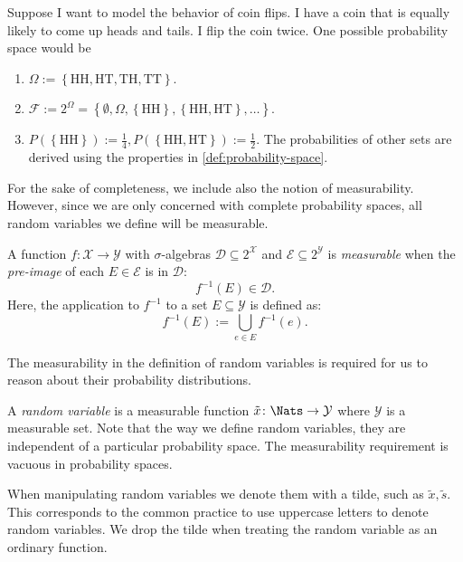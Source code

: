 \begin{example} \label{exm:probability-space}
 Suppose I want to model the behavior of coin flips. I have a coin that is equally likely to come up heads and tails. I flip the coin twice. One possible probability space would be
  \begin{enumerate}
  \item $\Omega := \left\{ \mathrm{HH}, \mathrm{HT}, \mathrm{TH}, \mathrm{TT} \right\}$.
  \item $\mathcal{F} := 2^{\Omega } = \left\{ \emptyset, \Omega, \left\{ \mathrm{HH} \right\}, \left\{ \mathrm{HH}, \mathrm{HT} \right\}, \dots  \right\}$.
  \item $P(\left\{ \mathrm{HH} \right\}) := \frac{1}{4},  P(\left\{ \mathrm{HH}, \mathrm{HT} \right\}) := \frac{1}{2}$. The probabilities of other sets are derived using the properties in \cref{def:probability-space}.
  \end{enumerate}
\end{example}


For the sake of completeness, we include also the notion of measurability. However, since we are only concerned with complete probability spaces, all random variables we define will be measurable. 
\begin{definition} \label{def:preimage-measurable}
A function $f\colon \mathcal{X} \to \mathcal{Y}$ with $\sigma$-algebras $\mathcal{D} \subseteq 2^{\mathcal{X}}$ and $\mathcal{E} \subseteq 2^{\mathcal{Y}}$ is \emph{measurable} when the \emph{pre-image} of each $E\in \mathcal{E}$ is in $\mathcal{D}$:
  \[
    f^{-1}(E) \in \mathcal{D}.
  \]
Here, the application to $f^{-1}$ to a set $E \subseteq \mathcal{Y}$ is defined as:
\begin{equation} 
f^{-1}(E) := \bigcup_{e \in E} f^{-1}(e) .
\end{equation}
\end{definition}
The measurability in the definition of random variables is required for us to reason about their probability distributions.

\begin{definition}
  A \emph{random variable} is a measurable function $\tilde{x}\colon \Nats \to \mathcal{Y}$ where $\mathcal{Y}$ is a measurable set. Note that the way we define random variables, they are independent of a particular probability space. The measurability requirement is vacuous in probability spaces.
\end{definition}
When manipulating random variables we denote them with a tilde, such as $\tilde{x}, \tilde{s}$. This corresponds to the common practice to use uppercase letters to denote random variables. We drop the tilde when treating the random variable as an ordinary function. 

